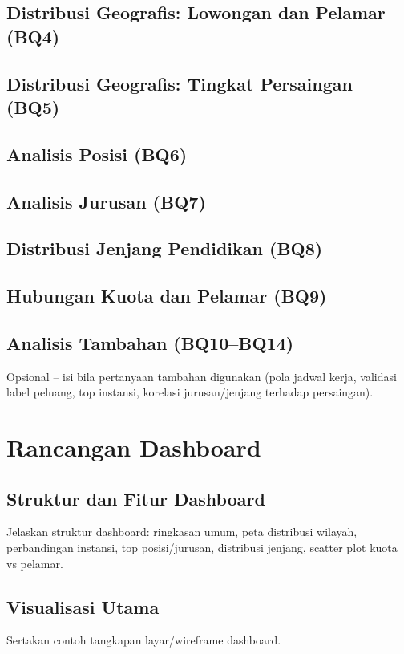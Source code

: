 \documentclass[11pt,a4paper]{report}
\begin{document}
\section{Distribusi Geografis: Lowongan dan Pelamar (BQ4)}

\section{Distribusi Geografis: Tingkat Persaingan (BQ5)}

\section{Analisis Posisi (BQ6)}

\section{Analisis Jurusan (BQ7)}

\section{Distribusi Jenjang Pendidikan (BQ8)}

\section{Hubungan Kuota dan Pelamar (BQ9)}

\section{Analisis Tambahan (BQ10--BQ14)}
Opsional -- isi bila pertanyaan tambahan digunakan (pola jadwal kerja, validasi label peluang, top instansi, korelasi jurusan/jenjang terhadap persaingan).

\chapter{Rancangan Dashboard}

\section{Struktur dan Fitur Dashboard}
Jelaskan struktur dashboard: ringkasan umum, peta distribusi wilayah, perbandingan instansi, top posisi/jurusan, distribusi jenjang, scatter plot kuota vs pelamar.

\section{Visualisasi Utama}
Sertakan contoh tangkapan layar/wireframe dashboard.
\end{document}
